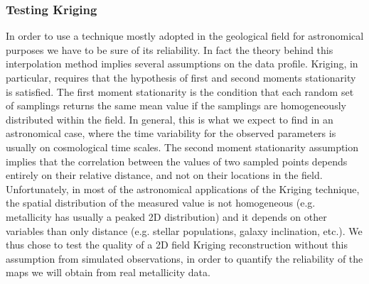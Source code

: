%	
	
	\subsubsection{Testing Kriging}
	In order to use a technique mostly adopted in the geological field for astronomical purposes we have to be sure of 
	its reliability. 
	In fact the theory behind this interpolation method implies several assumptions on the data profile. 
	Kriging, in particular, requires that the hypothesis of first and second moments stationarity is satisfied. 
	The first moment stationarity is the condition that each random set of samplings returns the same mean value if the 
	samplings are homogeneously distributed within the field. 
	In general, this is what we expect to find in an astronomical case, where the time variability for the observed parameters is 
	usually on cosmological time scales.
	The second moment stationarity assumption implies that the correlation between the values of two sampled 
	points depends entirely on their relative distance, and not on their locations in the field. 
	Unfortunately, in most of the astronomical applications of the Kriging technique, the spatial distribution of 
	the measured value is not homogeneous (e.g. metallicity has usually a peaked 2D distribution) and it depends on 
	other variables than only distance (e.g. stellar populations, galaxy inclination, etc.). 
	We thus chose to test the quality of a 2D field Kriging reconstruction without this assumption from simulated 
	observations, in order to quantify the reliability of the maps we will obtain from real metallicity data.
	
